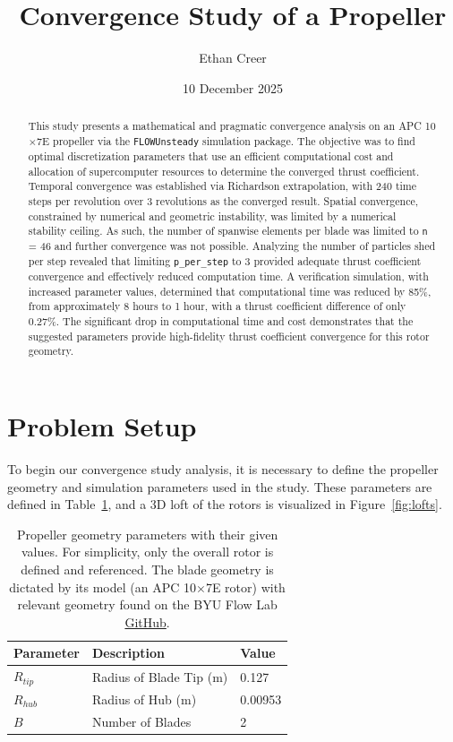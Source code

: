 \documentclass{article}
\title{Convergence Study of a Propeller}
\author{Ethan Creer}
\date{10 December 2025}
\begin{document}
\maketitle

\begin{abstract}
    This study presents a mathematical and pragmatic convergence analysis on an APC 10$\times$7E propeller via the \texttt{FLOWUnsteady} simulation package. The objective was to find optimal discretization parameters that use an efficient computational cost and allocation of supercomputer resources to determine the converged thrust coefficient. Temporal convergence was established via Richardson extrapolation, with 240 time steps per revolution over 3 revolutions as the converged result. Spatial convergence, constrained by numerical and geometric instability, was limited by a numerical stability ceiling. As such, the number of spanwise elements per blade was limited to \texttt{n} = 46 and further convergence was not possible. Analyzing the number of particles shed per step revealed that limiting \texttt{p\_per\_step} to 3 provided adequate thrust coefficient convergence and effectively reduced computation time. A verification simulation, with increased parameter values, determined that computational time was reduced by 85\%, from approximately 8 hours to 1 hour, with a thrust coefficient difference of only 0.27\%. The significant drop in computational time and cost demonstrates that the suggested parameters provide high-fidelity thrust coefficient convergence for this rotor geometry.
\end{abstract}


\section{Problem Setup}

To begin our convergence study analysis, it is necessary to define the propeller geometry and simulation parameters used in the study.
These parameters are defined in Table~\ref{tab:geometry}, and a 3D loft of the rotors is visualized in Figure~\ref{fig:lofts}.

\begin{table}[H]
    \centering
    \caption{Propeller geometry parameters with their given values. For simplicity, only the overall rotor is defined and referenced. The blade geometry is dictated by its model (an APC 10$\times$7E rotor) with relevant geometry found on the BYU Flow Lab \href{https://github.com/byuflowlab/FLOWUnsteady/tree/master/database/rotors}{GitHub}.}\label{tab:geometry}
    \begin{tabular}{l l l}
        \toprule
        \textbf{Parameter} & \textbf{Description} & \textbf{Value} \\
        \midrule
        $R_{tip}$ & Radius of Blade Tip (m) & 0.127 \\
        $R_{hub}$ & Radius of Hub (m) & 0.00953 \\
        $B$ & Number of Blades & 2 \\
    \end{tabular}
\end{table}
\end{document}
